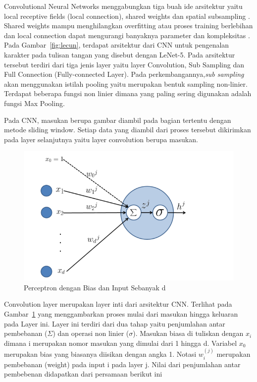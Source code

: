 Convolutional Neural Networks menggabungkan tiga buah ide arsitektur yaitu local receptive fields (local connection), shared weights dan spatial subsampling \citet{lecun1998gradient}. Shared weights mampu menghilangkan overfitting atau proses training berlebihan dan local connection dapat mengurangi banyaknya parameter dan kompleksitas \citet{hinton2010practical}. Pada Gambar~\ref{fig:lecun}, terdapat arsitektur dari CNN untuk pengenalan karakter pada tulisan tangan yang disebut dengan LeNet-5. Pada arsitektur tersebut terdiri dari tiga jenis layer yaitu layer Convolution, Sub Sampling dan Full Connection (Fully-connected Layer). Pada perkembangannya,\textit{sub sampling} akan menggunakan istilah pooling yaitu merupakan bentuk sampling non-linier. Terdapat beberapa fungsi non linier dimana yang paling sering digunakan adalah fungsi Max Pooling.

Pada CNN, masukan berupa gambar diambil pada bagian tertentu dengan metode sliding window. Setiap data yang diambil dari proses tersebut dikirimkan pada layer selanjutnya yaitu layer convolution berupa masukan.

\begin{figure}[ht]
 \includegraphics[width=\textwidth]{perceptron}
 \caption{Perceptron dengan Bias dan Input Sebanyak d}
 \label{fig:perceptron}   
\end{figure}

Convolution layer merupakan layer inti dari arsitektur CNN. Terlihat pada Gambar~\ref{fig:perceptron} yang menggambarkan proses mulai dari masukan hingga keluaran pada Layer ini. Layer ini terdiri dari dua tahap yaitu penjumlahan antar pembebanan ($\Sigma$) dan operasi non linier ($\sigma$). Masukan biasa di tuliskan dengan $x_{i}$ dimana i merupakan nomor masukan yang dimulai dari 1 hingga d. Variabel $x_{0}$ merupakan bias yang biasanya diisikan dengan angka 1. Notasi $w_{i}^{(j)}$ merupakan pembebanan (weight) pada input i pada layer j. Nilai dari penjumlahan antar pembebenan didapatkan dari persamaan berikut ini

